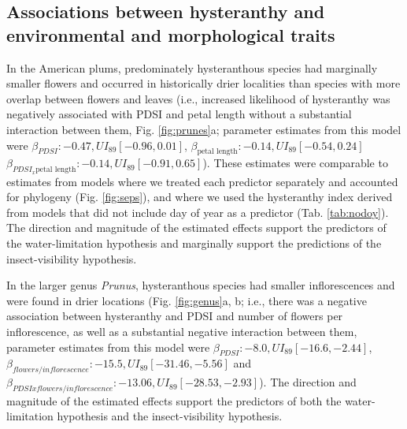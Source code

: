 \documentclass{article}[12pt]
\begin{document}
{\subsection*{Associations between hysteranthy and environmental and morphological traits}
In the American plums, predominately hysteranthous species had marginally smaller flowers and occurred in historically drier localities than species with more overlap between flowers and leaves (i.e., increased likelihood of hysteranthy was negatively associated with PDSI and petal length without a substantial interaction between them, Fig. \ref{fig:prunes}a; parameter estimates from this model were  $\beta_{PDSI}: -0.47, UI_{89}[-0.96, 0.01]$, $\beta_{\text{petal length}}: -0.14,UI_{89}[ -0.54, 0.24]$  $\beta_{PDSI_x \text{petal length}}: -0.14,UI_{89}[-0.91, 0.65]$). These estimates were comparable to estimates from models where we treated each predictor separately and accounted for phylogeny (Fig. \ref{fig:seps}), and where we used the hysteranthy index derived from models that did not include day of year as a predictor (Tab. \ref{tab:nodoy}). The direction and magnitude of the estimated effects support the predictors of the water-limitation hypothesis and marginally support the predictions of the insect-visibility hypothesis.
%

In the larger genus \emph{Prunus}, hysteranthous species had smaller inflorescences and were found in drier locations (Fig. \ref{fig:genus}a, b; i.e., there was a negative association between hysteranthy and PDSI and number of flowers per inflorescence, as well as a substantial negative interaction between them, parameter estimates from this model were  $\beta_{PDSI}:-8.0, UI_{89}[-16.6,-2.44]$,  $\beta_{flowers/inflorescence}: -15.5, UI_{89}[-31.46,-5.56]$ and $\beta_{PDSI x flowers/inflorescence}: -13.06, UI_{89}[-28.53,-2.93]$).  The direction and magnitude of the estimated effects support the predictors of both the water-limitation hypothesis and the insect-visibility hypothesis.

}
\end{document}

